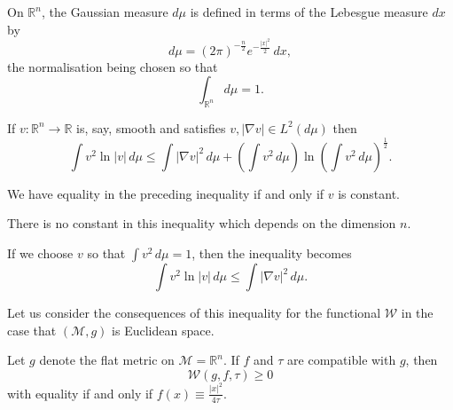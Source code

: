 On $\mathbb R^n$, the Gaussian measure $d\mu$ is defined in terms of the
Lebesgue measure $dx$ by
\[
d\mu = (2\pi)^{-\frac n2} e^{-\frac{|x|^2}{2}}\,dx,
\]
the normalisation being chosen so that
\[
\int_{\mathbb R^n} d\mu = 1.
\]

\begin{theorem}
\label{topping-ch8-gross-log-sobolev}
If $v:\mathbb R^n\to\mathbb R$ is, say, smooth and satisfies $v, |\nabla v|\in L^2(d\mu)$ then
\[
\int v^2\ln|v|\,d\mu \le \int |\nabla v|^2\,d\mu + \left(\int v^2\,d\mu\right) \ln\left(\int v^2\,d\mu\right)^{\frac12}.
\]
\end{theorem}

\begin{remark}
\label{topping-ch8-gross-equality}
We have equality in the preceding inequality if and only if $v$ is constant.
\end{remark}

\begin{remark}
\label{topping-ch8-gross-no-dimension-constant}
There is no constant in this inequality which depends on the dimension $n$.
\end{remark}

\begin{remark}
\label{topping-ch8-gross-unit-mass}
If we choose $v$ so that $\int v^2\,d\mu=1$, then the inequality becomes
\[
\int v^2\ln|v|\,d\mu \le \int |\nabla v|^2\,d\mu.
\]
\end{remark}

Let us consider the consequences of this inequality for the functional
$\mathcal W$ in the case that $(\mathcal M,g)$ is Euclidean space.

\begin{lemma}
\label{topping-ch8-euclidean-w-nonnegative}
Let $g$ denote the flat metric on $\mathcal M=\mathbb R^n$. If $f$ and $\tau$
are compatible with $g$, then
\[
\mathcal W(g,f,\tau)\ge 0
\]
with equality if and only if $f(x)\equiv \frac{|x|^2}{4\tau}$.
\end{lemma}

